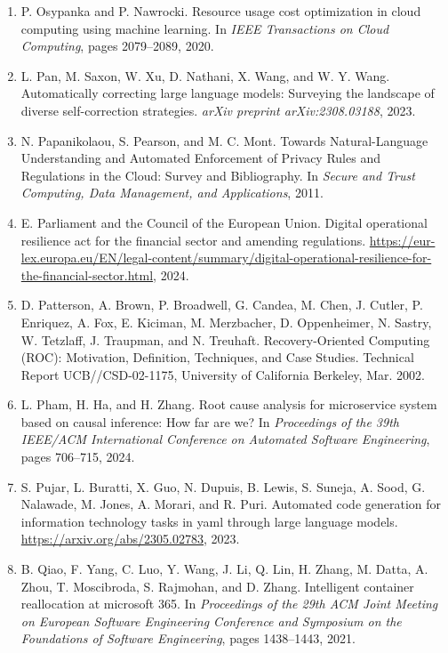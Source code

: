 \begin{enumerate}[leftmargin=2em,itemsep=2pt]
\item P. Osypanka and P. Nawrocki. Resource usage cost optimization in cloud computing using machine learning. In \textit{IEEE Transactions on Cloud Computing}, pages 2079--2089, 2020.

\item L. Pan, M. Saxon, W. Xu, D. Nathani, X. Wang, and W. Y. Wang. Automatically correcting large language models: Surveying the landscape of diverse self-correction strategies. \textit{arXiv preprint arXiv:2308.03188}, 2023.

\item N. Papanikolaou, S. Pearson, and M. C. Mont. Towards Natural-Language Understanding and Automated Enforcement of Privacy Rules and Regulations in the Cloud: Survey and Bibliography. In \textit{Secure and Trust Computing, Data Management, and Applications}, 2011.

\item E. Parliament and the Council of the European Union. Digital operational resilience act for the financial sector and amending regulations. \url{https://eur-lex.europa.eu/EN/legal-content/summary/digital-operational-resilience-for-the-financial-sector.html}, 2024.

\item D. Patterson, A. Brown, P. Broadwell, G. Candea, M. Chen, J. Cutler, P. Enriquez, A. Fox, E. Kiciman, M. Merzbacher, D. Oppenheimer, N. Sastry, W. Tetzlaff, J. Traupman, and N. Treuhaft. Recovery-Oriented Computing (ROC): Motivation, Definition, Techniques, and Case Studies. Technical Report UCB//CSD-02-1175, University of California Berkeley, Mar. 2002.

\item L. Pham, H. Ha, and H. Zhang. Root cause analysis for microservice system based on causal inference: How far are we? In \textit{Proceedings of the 39th IEEE/ACM International Conference on Automated Software Engineering}, pages 706--715, 2024.

\item S. Pujar, L. Buratti, X. Guo, N. Dupuis, B. Lewis, S. Suneja, A. Sood, G. Nalawade, M. Jones, A. Morari, and R. Puri. Automated code generation for information technology tasks in yaml through large language models. \url{https://arxiv.org/abs/2305.02783}, 2023.

\item B. Qiao, F. Yang, C. Luo, Y. Wang, J. Li, Q. Lin, H. Zhang, M. Datta, A. Zhou, T. Moscibroda, S. Rajmohan, and D. Zhang. Intelligent container reallocation at microsoft 365. In \textit{Proceedings of the 29th ACM Joint Meeting on European Software Engineering Conference and Symposium on the Foundations of Software Engineering}, pages 1438--1443, 2021.


\end{enumerate}
